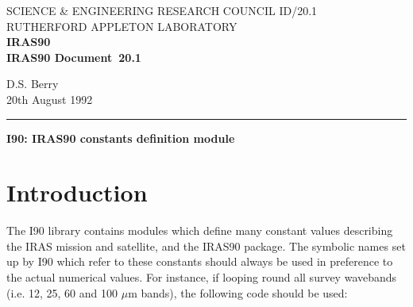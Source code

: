 \pagestyle{myheadings}

\newcommand{\irasdoccategory}  {IRAS90 Document}
\newcommand{\irasdocinitials}  {ID}
\newcommand{\irasdocnumber}    {20.1}
\newcommand{\irasdocauthors}   {D.S. Berry}
\newcommand{\irasdocdate}      {20th August 1992}
\newcommand{\irasdoctitle}     {I90: IRAS90 constants definition module}

\newcommand{\irasdocname}{\irasdocinitials /\irasdocnumber}
\renewcommand{\_}{{\tt\char'137}}     %
\markright{\irasdocname}
\setlength{\textwidth}{160mm}
\setlength{\textheight}{240mm}
\setlength{\topmargin}{-5mm}
\setlength{\oddsidemargin}{0mm}
\setlength{\evensidemargin}{0mm}
\setlength{\parindent}{0mm}
\setlength{\parskip}{\medskipamount}
\setlength{\unitlength}{1mm}



\thispagestyle{empty}
SCIENCE \& ENGINEERING RESEARCH COUNCIL \hfill \irasdocname\\
RUTHERFORD APPLETON LABORATORY\\
{\large\bf IRAS90\\}
{\large\bf \irasdoccategory\ \irasdocnumber}
\begin{flushright}
\irasdocauthors\\
\irasdocdate
\end{flushright}
\vspace{-4mm}
\rule{\textwidth}{0.5mm}
\vspace{5mm}
\begin{center}
{\Large\bf \irasdoctitle}
\end{center}
\vspace{5mm}
\setlength{\parskip}{0mm}
\tableofcontents
\setlength{\parskip}{\medskipamount}
\markright{\irasdocname}

\section {Introduction}

The I90 library contains modules which define many constant values describing
the IRAS mission and satellite, and the IRAS90 package. The symbolic names set
up by I90 which refer to these constants should always be used in preference to
the actual numerical values. For instance, if looping round all survey wavebands
(i.e. 12, 25, 60 and 100 $\mu$m bands), the following code should be used:

